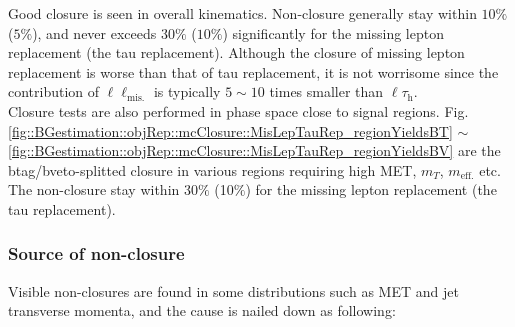 Good closure is seen in overall kinematics. Non-closure generally stay within $10\%$ ($5\%$), and never exceeds $30\%$ ($10\%$) significantly for the missing lepton replacement (the tau replacement).
Although the closure of missing lepton replacement is worse than that of tau replacement, it is not worrisome since the contribution of $\ell\ell_{\mathrm{mis.}}$ is typically $5\sim10$ times smaller than $\ell\tau_{\mathrm{h}}$. \\

Closure tests are also performed in phase space close to signal regions. 
Fig. \ref{fig::BGestimation::objRep::mcClosure::MisLepTauRep_regionYieldsBT} $\sim$ \ref{fig::BGestimation::objRep::mcClosure::MisLepTauRep_regionYieldsBV} 
are the btag/bveto-splitted closure in various regions requiring high MET, $m_{T}$, $m_{\mathrm{eff.}}$ etc. The non-closure stay within 30$\%$ (10$\%$) for the missing lepton replacement (the tau replacement).\\





%
%
%
%




\clearpage
\subsubsection{Source of non-closure} \label{sec::BGestimation::objRep::NonClosure} 
Visible non-closures are found in some distributions such as MET and jet transverse momenta, and the cause is nailed down as following:

